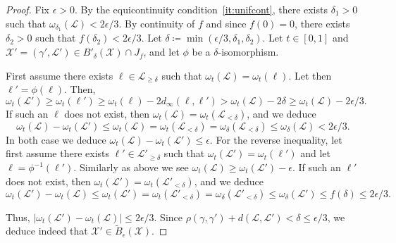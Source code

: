 \documentclass[11pt]{article}
\begin{document}
\begin{proof}
  Fix $\epsilon>0$. By the equicontinuity condition~\eqref{it:unifcont}, there exists $\delta_1>0$ such that $\omega_{\delta_1}(\mathcal{L})<2\epsilon/3$. By continuity of $f$ and since $f(0)=0$, there exists $\delta_2>0$ such that $f(\delta_2)<2\epsilon/3$. Let $\delta\coloneqq \min(\epsilon/3,\delta_1,\delta_2)$.
  Let $t\in[0,1]$
  and $\mathcal{X}'=(\gamma',\mathcal{L}')\in B'_{\delta}(\mathcal{X})\cap J_f$, and let $\phi$ be a $\delta$-isomorphism.

  First assume there exists $\ell \in \mathcal{L}_{\geq \delta}$ such that  $\omega_t(\mathcal{L})=\omega_t(\ell )$.
  Let then $\ell'=\phi(\ell)$. Then,
  \[\omega_t(\mathcal{L}')\geq \omega_t(\ell')\geq \omega_t(\ell)-2 d_\infty(\ell,\ell')> \omega_t(\mathcal{L})-2 \delta\geq \omega_t(\mathcal{L})-2\epsilon/3.\]
  If such an $\ell$ does not exist,  then $\omega_t(\mathcal{L})=\omega_t(\mathcal{L}_{< \delta})$, and we deduce
   \[\omega_t(\mathcal{L})-\omega_t(\mathcal{L}')\leq\omega_t(\mathcal{L})  =\omega_t(\mathcal{L}_{< \delta})=\omega_\delta(\mathcal{L}_{<\delta})\leq \omega_\delta(\mathcal{L})<2\epsilon/3.
   \]
  In both case we deduce $\omega_t(\mathcal{L})-\omega_t(\mathcal{L}')\leq \epsilon$. For the reverse inequality, let
  first assume there exists $\ell' \in \mathcal{L}'_{\geq \delta}$ such that  $\omega_t(\mathcal{L}')=\omega_t(\ell')$ and let $\ell=\phi^{-1}(\ell')$. Similarly as above we see $\omega_t(\mathcal{L})\geq \omega_t(\mathcal{L}')-\epsilon$. If such an $\ell'$ does not exist, then
  $\omega_t(\mathcal{L}')=\omega_t(\mathcal{L}'_{< \delta})$, and we deduce
   \[\omega_t(\mathcal{L}')-\omega_t(\mathcal{L})\leq\omega_t(\mathcal{L}')  =\omega_t(\mathcal{L}'_{< \delta})=\omega_\delta(\mathcal{L}'_{<\delta})\leq \omega_\delta(\mathcal{L}')\leq f(\delta)\leq 2\epsilon/3.\]

  Thus, $|\omega_t(\mathcal{L}')-\omega_t(\mathcal{L})|\leq 2\epsilon/3$. Since $\rho(\gamma,\gamma')+d( \mathcal{L},\mathcal{L}'  )< \delta\leq \epsilon/3$, we deduce indeed that $\mathcal{X}'\in \tilde{B}_\epsilon(\mathcal{X})$.
\end{proof}
\end{document}
